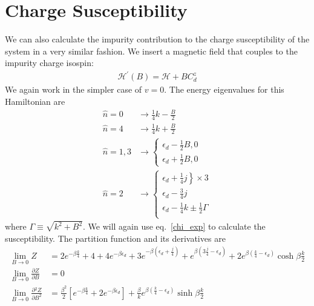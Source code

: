 \documentclass[twoside,11pt]{report}
\numberwithin{equation}{section}
\begin{document}
\section{Charge Susceptibility}
We can also calculate the impurity contribution to the charge susceptibility of the system in a very similar fashion. We insert a magnetic field that couples to the impurity charge isospin:
\begin{equation}\begin{aligned}
	\mathcal{H}^\prime(B) = \mathcal{H} + B C_d^z
\end{aligned}\end{equation}
We again work in the simpler case of \(v=0\). The energy eigenvalues for this Hamiltonian are
\begin{equation}\begin{aligned}
\hat n=0 & \rightarrow\frac{1}{4}k - \frac{B}{2}\\
\hat n=4 &\rightarrow\frac{1}{4}k + \frac{B}{2}\\
\hat n=1,3 &\rightarrow \begin{cases}
	\epsilon_d - \frac{1}{2}B, 0\\ 
	\epsilon_d + \frac{1}{2}B, 0
	\end{cases}\\
	\hat n=2 &\rightarrow \begin{cases}
	\left.\epsilon_d + \frac{1}{4}j \right\}\times 3\\
	\epsilon_d - \frac{3}{4}j \\
	\epsilon_d -\frac{1}{4}k \pm \frac{1}{2} \Gamma \\
\end{cases}
\end{aligned}\end{equation}
where \(\Gamma \equiv \sqrt{k^2 + B^2}\). We will again use eq.~\ref{chi_exp} to calculate the susceptibility. The partition function and its derivatives are
\begin{equation}\begin{aligned}
	\lim_{B \to 0} Z &= 2e^{-\beta \frac{k}{4}} + 4 + 4e^{-\beta \epsilon_d} + 3e^{-\beta\left( \epsilon_d + \frac{j}{4} \right) } + e^{\beta\left( 3\frac{j}{4} - \epsilon_d \right)} + 2e^{\beta \left(\frac{k}{4} - \epsilon_d\right)}\cosh \beta \frac{k}{2}\\
	\lim_{B \to 0} \frac{\partial{Z}}{\partial{B}} &= 0 \\
	\lim_{B \to 0} \frac{\partial{^2Z}}{\partial{B^2}} &= \frac{\beta^2}{2}\left[e^{-\beta \frac{k}{4}} + 2e^{-\beta \epsilon_d}\right] + \frac{\beta}{k}e^{\beta\left(\frac{k}{4} - \epsilon_d\right)}\sinh \beta\frac{k}{2}
\end{aligned}\end{equation}
\end{document}
